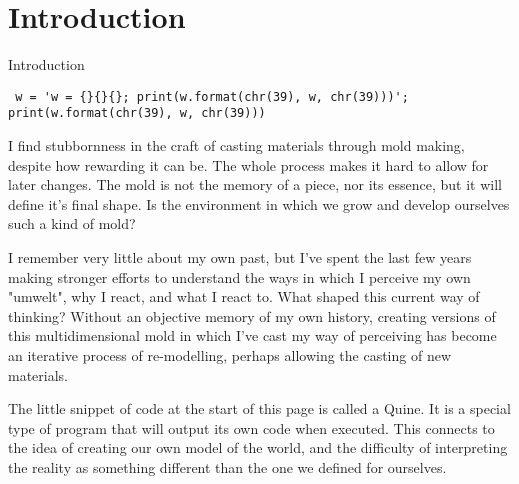 \chapter*{Introduction}


\begin{center}
\vspace*{\fill}
\Huge{Introduction}

\vspace{2cm}

\begin{flushright}
\footnotesize \begin{verbatim}
 w = 'w = {}{}{}; print(w.format(chr(39), w, chr(39)))'; print(w.format(chr(39), w, chr(39)))
\end{verbatim} \normalsize
\end{flushright}

\vspace*{\fill}
\end{center}



I find stubbornness in the craft of casting materials through mold making, despite how rewarding it can be. The whole process makes it hard to allow for later changes. The mold is not the memory of a piece, nor its essence, but it will define it's final shape. Is the environment in which we grow and develop ourselves such a kind of mold? 

I remember very little about my own past, but I’ve spent the last few years making stronger efforts to understand the ways in which I perceive my own "umwelt", why I react, and what I react to. What shaped this current way of thinking? Without an objective memory of my own history, creating versions of this multidimensional mold in which I’ve cast my way of perceiving has become an iterative process of re-modelling, perhaps allowing the casting of new materials.


The little snippet of code at the start of this page is called a Quine. It is a special type of program that will output its own code when executed. 
This connects to the idea of creating our own model of the world, and the difficulty of interpreting the reality as something different than the one we defined for ourselves. 
